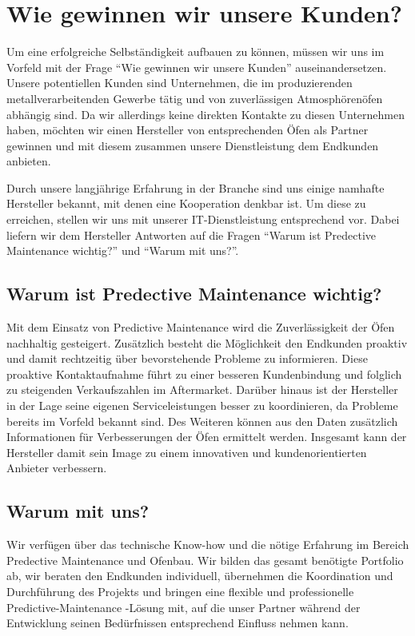 \section{Wie gewinnen wir unsere Kunden?}
Um eine erfolgreiche Selbständigkeit aufbauen zu können, müssen wir uns im Vorfeld mit der Frage “Wie gewinnen wir unsere Kunden” auseinandersetzen.
Unsere potentiellen Kunden sind Unternehmen, die im produzierenden metallverarbeitenden Gewerbe tätig und von zuverlässigen Atmosphörenöfen abhängig sind. Da wir allerdings keine direkten Kontakte zu diesen Unternehmen haben, möchten wir einen Hersteller von entsprechenden Öfen als Partner gewinnen und mit diesem zusammen unsere Dienstleistung dem Endkunden anbieten.

Durch unsere langjährige Erfahrung in der Branche sind uns einige namhafte Hersteller bekannt, mit denen eine Kooperation denkbar ist. Um diese zu erreichen, stellen wir uns mit unserer IT-Dienstleistung entsprechend vor. Dabei liefern wir dem Hersteller Antworten auf die Fragen “Warum ist Predective Maintenance wichtig?” und “Warum mit uns?”.

\subsection{Warum ist Predective Maintenance wichtig?}
Mit dem Einsatz von Predictive Maintenance wird die Zuverlässigkeit der Öfen nachhaltig gesteigert. Zusätzlich besteht die Möglichkeit den Endkunden proaktiv und damit rechtzeitig über bevorstehende Probleme zu informieren. Diese proaktive Kontaktaufnahme führt zu einer besseren Kundenbindung und folglich zu steigenden Verkaufszahlen im Aftermarket. Darüber hinaus ist der Hersteller in der Lage seine eigenen Serviceleistungen besser zu koordinieren, da Probleme bereits im Vorfeld bekannt sind. Des Weiteren können aus den Daten zusätzlich Informationen für Verbesserungen der Öfen ermittelt werden.
Insgesamt kann der Hersteller damit sein Image zu einem innovativen und kundenorientierten Anbieter verbessern.

\subsection{Warum mit uns?}
Wir verfügen über das technische Know-how und die nötige Erfahrung im Bereich Predective Maintenance und Ofenbau. Wir bilden das gesamt benötigte Portfolio ab, wir beraten den Endkunden individuell, übernehmen die Koordination und Durchführung des Projekts und bringen eine flexible und professionelle Predictive-Maintenance -Lösung mit, auf die unser Partner während der Entwicklung seinen Bedürfnissen entsprechend Einfluss nehmen kann. 

